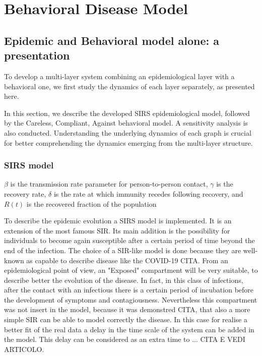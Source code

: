 \part{Behavioral Disease Model}
\label{part:the_model}
\chapter{Epidemic and Behavioral model alone: a presentation}
\label{ch:model_alone}


To develop a multi-layer system combining an epidemiological layer with a behavioral one, we first study the dynamics of each layer separately, as presented here. 

In this section, we describe the developed SIRS epidemiological model, followed by the Careless, Compliant, Against behavioral model. A sensitivity analysis is also conducted. Understanding the underlying dynamics of each graph is crucial for better comprehending the dynamics emerging from the multi-layer structure.


\section{SIRS model}
\label{sec:SIRS}

$\beta$ is the transmission rate parameter for person-to-person
contact, $\gamma$ is the recovery rate, $\delta$ is the rate at which
immunity recedes following recovery, and $R(t)$ is the recovered
fraction of the population

To describe the epidemic evolution a  SIRS model is implemented. It is an extension of the most famous SIR. Its main addition is the possibility for individuals to become again susceptible after a certain period of time beyond the end of the infection. The choice of a SIR-like model is done because they are well-known as capable to describe disease like the COVID-19 CITA. From an epidemiological point of view, an "Exposed" compartment will be very suitable, to describe better the evolution of the disease. In fact, in this class of infections, after the contact with an infectious there is a certain period of incubation before the development of symptoms and contagiousness. Nevertheless this compartment was not insert in the model, because it was demonstred CITA, that also a more simple SIR can be able to model correctly the disease. In this case for realise a better fit of the real data a delay in the time scale of the system can be added in the model. This delay can be considered as an extra time to ... CITA E VEDI ARTICOLO.

